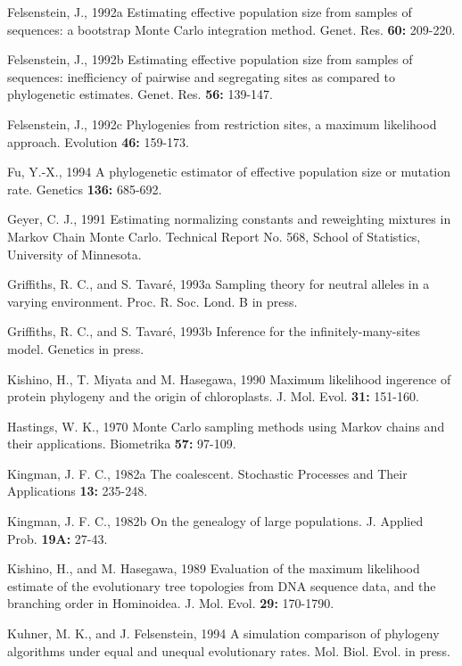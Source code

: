 {\parindent=-0.2in

\medskip
{\sc Felsenstein}, J., 1992a  Estimating effective population size from
samples of sequences:  a bootstrap Monte Carlo integration method.
Genet. Res. {\bf 60:} 209-220.

\medskip
{\sc Felsenstein}, J., 1992b  Estimating effective population size from
samples of sequences:  inefficiency of pairwise and segregating sites as
compared to phylogenetic estimates.  Genet. Res. {\bf 56:} 139-147.

\medskip
{\sc Felsenstein,} J.,  1992c  Phylogenies from restriction sites, a maximum
likelihood approach.  Evolution  {\bf 46:} 159-173.

\medskip
{\sc Fu,} Y.-X., 1994  A phylogenetic estimator of effective population
size or mutation rate.  Genetics {\bf 136:} 685-692.

\medskip
{\sc Geyer,} C. J., 1991  Estimating normalizing constants and reweighting
mixtures in Markov Chain Monte Carlo.  Technical Report No. 568, School
of Statistics, University of Minnesota.

\medskip
{\sc Griffiths,} R. C., and S. {\sc Tavar\'{e}}, 1993a  Sampling theory for neutral
alleles in a varying environment.  Proc. R. Soc. Lond. B in press.

\medskip
{\sc Griffiths,} R. C., and S. {\sc Tavar\'{e}}, 1993b  Inference for the 
infinitely-many-sites model.  Genetics in press.

\medskip
{\sc Kishino, H., T. Miyata} and {\sc M. Hasegawa}, 1990  Maximum
likelihood ingerence of protein phylogeny and the origin of
chloroplasts.  J. Mol. Evol. {\bf 31:} 151-160.

\medskip
{\sc Hastings,} W. K., 1970  Monte Carlo sampling methods using Markov chains
and their applications.  Biometrika {\bf 57:} 97-109.

\medskip
{\sc Kingman,} J. F. C.,  1982a  The coalescent.  Stochastic Processes and 
Their Applications {\bf 13:} 235-248.

\medskip
{\sc Kingman,} J. F. C.,  1982b  On the genealogy of large populations.  J.
Applied Prob. {\bf 19A:} 27-43.

\medskip
{\sc Kishino,} H., and M. {\sc Hasegawa,} 1989  Evaluation of the maximum likelihood
estimate of the evolutionary tree topologies from DNA sequence data, and
the branching order in Hominoidea.  J. Mol. Evol. {\bf 29:} 170-1790.

\medskip
{\sc Kuhner,} M. K., and J. {\sc Felsenstein,} 1994  A simulation
comparison of phylogeny algorithms under equal and unequal evolutionary
rates.  Mol. Biol. Evol. in press.

}
